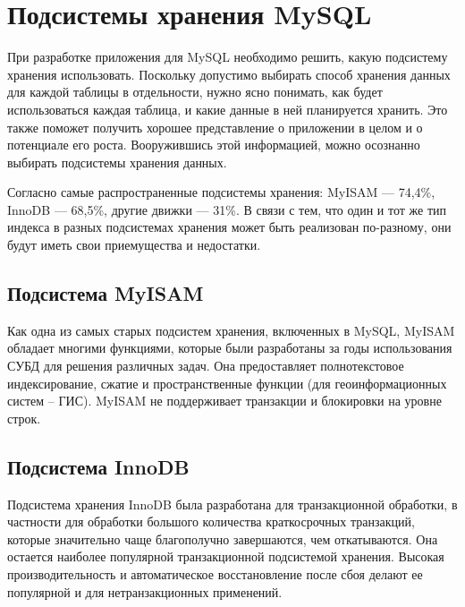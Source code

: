 \section{Подсистемы хранения MySQL}

При разработке приложения для MySQL необходимо решить, какую подсистему хранения использовать. Поскольку допустимо выбирать способ хранения данных для каждой таблицы в отдельности, нужно ясно понимать, как будет использоваться каждая таблица, и какие данные в ней планируется хранить. Это также поможет получить хорошее представление о приложении в целом и о потенциале его роста. Вооружившись этой информацией, можно осознанно выбирать подсистемы хранения данных.

Согласно \cite{tagline.ru:List_DBMS} самые распространенные подсистемы хранения: MyISAM — 74,4\%, InnoDB — 68,5\%, другие движки — 31\%. В связи с тем, что один и тот же тип индекса в разных подсистемах хранения может быть реализован по-разному, они будут иметь свои приемущества и недостатки. \cite[p.~137]{zaitsev}

\subsection{Подсистема MyISAM}

Как одна из самых старых подсистем хранения, включенных в MySQL, MyISAM обладает многими функциями, которые были разработаны за годы использования СУБД для решения различных задач. Она предоставляет полнотекстовое индексирование, сжатие и пространственные функции (для геоинформационных систем – ГИС). MyISAM не поддерживает транзакции и блокировки на уровне строк.


\subsection{Подсистема InnoDB}

Подсистема хранения InnoDB была разработана для транзакционной обработки, в частности для обработки большого количества краткосрочных транзакций, которые значительно чаще благополучно завершаются, чем откатываются. Она остается наиболее популярной транзакционной подсистемой хранения. Высокая производительность и автоматическое восстановление после сбоя делают ее популярной и для нетранзакционных применений.
